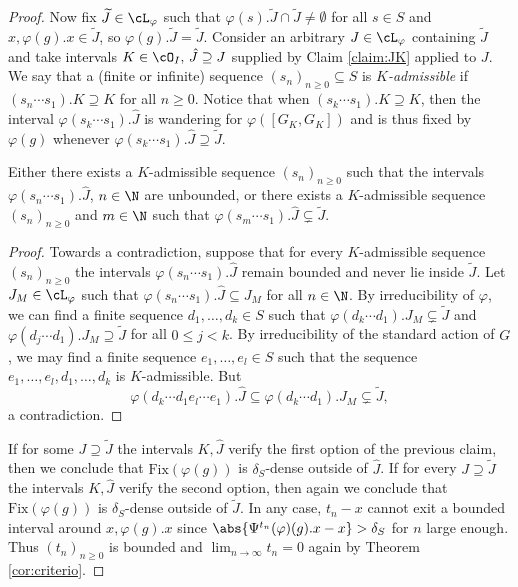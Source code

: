 \documentclass[reqno]{amsart}
\begin{document}
\begin{proof}
Now fix $\widetilde{J} \in \cL_\varphi$ such that $\varphi(s).\widetilde{J} \cap \widetilde{J} \neq \emptyset$ for all $s \in S$ and $x, \varphi(g).x \in \widetilde{J}$, so $\varphi(g).\widetilde{J} = \widetilde{J}$. Consider an arbitrary $J \in \cL_\varphi$ containing $\widetilde{J}$ and take intervals $K \in \cO_I,\, \hat{J} \supseteq J$ supplied by Claim \ref{claim:JK} applied to $J$. We say that a (finite or infinite) sequence $(s_n)_{n \geq 0} \subseteq S$ is \emph{$K$-admissible} if $(s_n\cdots s_1).K \supseteq K$ for all $n \geq 0$. Notice that when $(s_k \cdots s_1).K \supseteq K$, then the interval $\varphi(s_k \cdots s_1).\hat{J}$ is wandering for $\varphi([G_{K}, G_{K}])$ and is thus fixed by $\varphi(g)$ whenever $\varphi(s_k \cdots s_1).\hat{J} \supseteq \widetilde{J}$.
\begin{claimnum}
	Either there exists a $K$-admissible sequence $(s_n)_{n \geq 0}$ such that the intervals $\varphi(s_n\cdots s_1).\hat{J}$, $n \in \N$ are unbounded, or there exists a $K$-admissible sequence $(s_n)_{n \geq 0}$ and $m \in \N$ such that $\varphi(s_m \cdots s_1).\hat{J} \subsetneq \widetilde{J}$.
\end{claimnum}
\begin{proof}
Towards a contradiction, suppose that for every $K$-admissible sequence $(s_n)_{n \geq 0}$ the intervals $\varphi(s_n \cdots s_1).\hat{J}$ remain bounded and never lie inside $\widetilde{J}$. Let $J_M \in \cL_\varphi$ such that $\varphi(s_n \cdots s_1).\hat{J} \subseteq J_M$ for all $n \in \N$. By irreducibility of $\varphi$, we can find a finite sequence $d_1, \ldots, d_k \in S$ such that $\varphi(d_k \cdots d_1).J_M \subsetneq \widetilde{J}$ and $\varphi(d_j \cdots d_1).J_M \supseteq \widetilde{J}$ for all $0 \leq j < k$. By irreducibility of the standard action of $G$, we may find a finite sequence $e_1, \ldots, e_l \in S$  such that the sequence $e_1,\ldots, e_l, d_1,\ldots, d_k$ is $K$-admissible. But
\[
	\varphi(d_k \cdots d_1 e_l \cdots e_1). \hat{J} \subseteq \varphi(d_k \cdots d_1).J_M \subsetneq \widetilde{J},
\]
a contradiction.
\end{proof}

If for some $J \supseteq \widetilde{J}$ the intervals $K, \hat{J}$ verify the first option of the previous claim, then we conclude that $\mathrm{Fix}(\varphi(g))$ is $\delta_S$-dense outside of $\hat{J}$. If for every $J \supseteq \widetilde{J}$ the intervals $K, \hat{J}$ verify the second option, then again we conclude that $\mathrm{Fix}(\varphi(g))$ is $\delta_S$-dense outside of $\widetilde{J}$. In any case, $t_n - x$ cannot exit a bounded interval around $x, \varphi(g).x$ since $\abs{\Psi^{t_n}(\varphi)(g).x - x} > \delta_S$ for $n$ large enough. Thus $(t_n)_{n \geq 0}$ is bounded and $\lim_{n \to \infty} t_n = 0$ again by Theorem \ref{cor:criterio}.
\end{proof}
\end{document}
